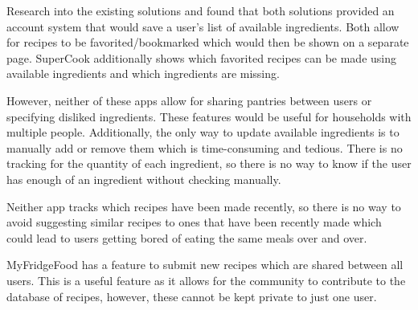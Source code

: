 \documentclass[../CHEFCookingHelperForEveryonesFridge.tex]{subfiles}
\renewcommand{\cite}[1]{\parencite{#1}}
\begin{document}
Research into the existing solutions \cite{myfridgefood_myfridgefood_nodate} and \cite{supercook_supercook_nodate} found that both solutions provided an account
system that would save a user's list of available ingredients. Both allow for recipes to be favorited/bookmarked which would then be shown on a separate page.
SuperCook additionally shows which favorited recipes can be made using available ingredients and which ingredients are missing.

However, neither of these apps allow for sharing pantries between users or specifying disliked ingredients. These features would be useful for households with multiple people.
Additionally, the only way to update available ingredients is to manually add or remove them which is time-consuming and tedious. There is no tracking for the quantity of
each ingredient, so there is no way to know if the user has enough of an ingredient without checking manually.

Neither app tracks which recipes have been made recently, so there is no way to avoid suggesting similar recipes to ones that have been recently made which could lead to
users getting bored of eating the same meals over and over.

MyFridgeFood has a feature to submit new recipes which are shared between all users. This is a useful feature as it allows for the community to contribute to the database
of recipes, however, these cannot be kept private to just one user.
\end{document}
